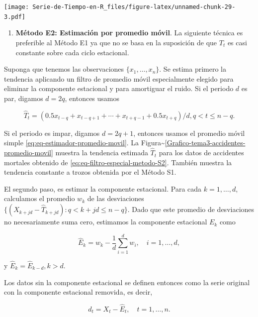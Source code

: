 \documentclass[12pt,]{krantz}
\providecommand{\tightlist}{%
  \setlength{\itemsep}{0pt}\setlength{\parskip}{0pt}}
\theoremstyle{definition}
\theoremstyle{definition}
\theoremstyle{definition}
\theoremstyle{remark}
\begin{document}
\texttt{[image: Serie-de-Tiempo-en-R\_files/figure-latex/unnamed-chunk-29-3.pdf]}

\begin{enumerate}
\def\labelenumi{\arabic{enumi})}
\setcounter{enumi}{1}
\tightlist
\item
  \textbf{Método E2: Estimación por promedio móvil}. La siguiente
  técnica es preferible al Método E1 ya que no se basa en la suposición
  de que \(T_t\) es casi constante sobre cada ciclo estacional.
\end{enumerate}

Suponga que tenemos las observaciones \(\{x_1,\ldots,x_n\}\). Se estima
primero la tendencia aplicando un filtro de promedio móvil especialmente
elegido para eliminar la componente estacional y para amortiguar el
ruido. Si el periodo \(d\) es par, digamos \(d=2q\), entonces usamos

\begin{equation}
\hat{T}_t = (0.5x_{t-q} + x_{t-q+1} + \cdots + x_{t+q-1} + 0.5x_{t+q})/d, q<t\leq n-q.
\label{eq:eq-filtro-especial-metodo-S2}
\end{equation}

Si el periodo es impar, digamos \(d=2q+1\), entonces usamos el promedio
móvil simple \eqref{eq:eq-estimador-promedio-movil}. La
Figura\textasciitilde{}\ref{Grafico-tema3-accidentes-promedio-movil}
muestra la tendencia estimada \(\hat{T}_t\) para los datos de accidentes
mortales obtenido de \eqref{eq:eq-filtro-especial-metodo-S2}. También
muestra la tendencia constante a trozos obtenida por el Método S1.

El segundo paso, es estimar la componente estacional. Para cada
\(k=1,\ldots,d\), calculamos el promedio \(w_k\) de las desviaciones
\(\{(X_{k+jd}-\hat{T}_{k+jd}):q<k+jd\leq n-q\}\). Dado que este promedio
de desviaciones no necesariamente suma cero, estimamos la componente
estacional \(E_k\) como

\begin{equation}
\hat{E}_k = w_k -\frac{1}{d}\sum_{i=1}^dw_i,\quad i=1,\ldots,d,
\label{eq:eq-estimador-Et-metodo-S2}
\end{equation}

y \(\hat{E}_k=\hat{E}_{k-d},k>d\).

Los datos sin la componente estacional se definen entonces como la serie
original con la componente estacional removida, es decir,

\begin{equation}
d_t = X_t-\hat{E}_t,\quad t=1,\ldots,n.
\label{eq:eq-serie-destacionalizada}
\end{equation}
\end{document}
